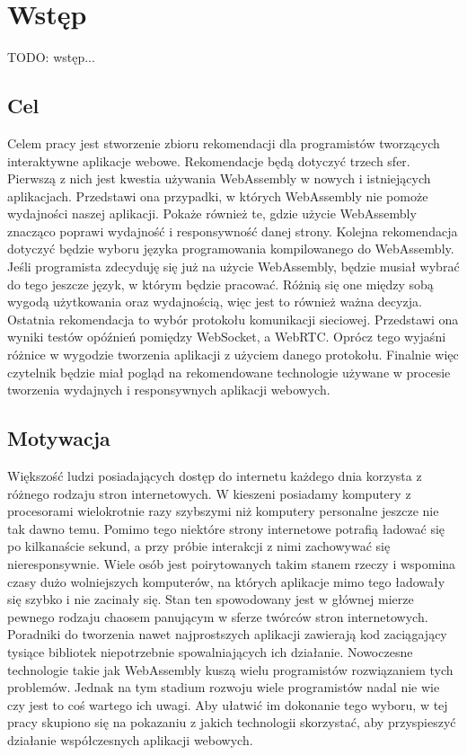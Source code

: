 \documentclass[language=polish,type=master]{aghmodern}
\author{Piotr Szczygieł}
\date{2022}
\begin{document}
\frontmatter
\maketitle
\tableofcontents

\mainmatter

\onehalfspacing

\chapter{Wstęp}
TODO: wstęp...

\section{Cel}
Celem pracy jest stworzenie zbioru rekomendacji dla programistów tworzących interaktywne aplikacje webowe.
Rekomendacje będą dotyczyć trzech sfer.
Pierwszą z nich jest kwestia używania WebAssembly w nowych i istniejących aplikacjach.
Przedstawi ona przypadki, w których WebAssembly nie pomoże wydajności naszej aplikacji.
Pokaże również te, gdzie użycie WebAssembly znacząco poprawi wydajność i responsywność danej strony.
Kolejna rekomendacja dotyczyć będzie wyboru języka programowania kompilowanego do WebAssembly.
Jeśli programista zdecyduję się już na użycie WebAssembly, będzie musiał wybrać do tego jeszcze język, w którym będzie pracować.
Różnią się one między sobą wygodą użytkowania oraz wydajnością, więc jest to również ważna decyzja.
Ostatnia rekomendacja to wybór protokołu komunikacji sieciowej.
Przedstawi ona wyniki testów opóźnień pomiędzy WebSocket, a WebRTC.
Oprócz tego wyjaśni różnice w wygodzie tworzenia aplikacji z użyciem danego protokołu.
Finalnie więc czytelnik będzie miał pogląd na rekomendowane technologie używane w procesie tworzenia wydajnych i responsywnych aplikacji webowych.

\section{Motywacja}
Większość ludzi posiadających dostęp do internetu każdego dnia korzysta z różnego rodzaju stron internetowych.
W kieszeni posiadamy komputery z procesorami wielokrotnie razy szybszymi niż komputery personalne jeszcze nie tak dawno temu.
Pomimo tego niektóre strony internetowe potrafią ładować się po kilkanaście sekund, a przy próbie interakcji z nimi zachowywać się nieresponsywnie.
Wiele osób jest poirytowanych takim stanem rzeczy i wspomina czasy dużo wolniejszych komputerów, na których aplikacje mimo tego ładowały się szybko i nie zacinały się.
Stan ten spowodowany jest w głównej mierze pewnego rodzaju chaosem panującym w sferze twórców stron internetowych.
Poradniki do tworzenia nawet najprostszych aplikacji zawierają kod zaciągający tysiące bibliotek niepotrzebnie spowalniających ich działanie.
Nowoczesne technologie takie jak WebAssembly kuszą wielu programistów rozwiązaniem tych problemów.
Jednak na tym stadium rozwoju wiele programistów nadal nie wie czy jest to coś wartego ich uwagi.
Aby ułatwić im dokonanie tego wyboru, w tej pracy skupiono się na pokazaniu z jakich technologii skorzystać, aby przyspieszyć działanie współczesnych aplikacji webowych.
\end{document}
